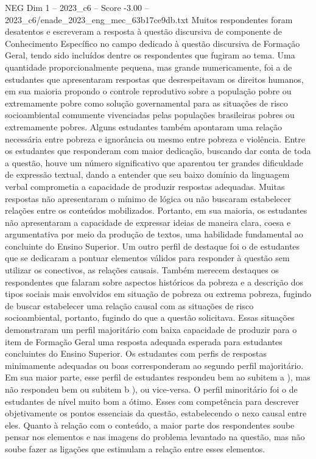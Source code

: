 \begin{textsample}{NEG Dim 1 – 2023\_c6 – Score -3.00 – 2023\_c6/enade\_2023\_eng\_mec\_63b17ce9db.txt}
Muitos respondentes foram desatentos e escreveram a resposta à questão discursiva de componente de Conhecimento Específico no campo dedicado à questão discursiva de Formação Geral, tendo sido incluídos dentre os respondentes que fugiram ao tema.
Uma quantidade proporcionalmente pequena, mas grande numericamente, foi a de estudantes que apresentaram respostas que desrespeitavam os direitos humanos, em sua maioria propondo o controle reprodutivo sobre a população pobre ou extremamente pobre como solução governamental para as situações de risco socioambiental comumente vivenciadas pelas populações brasileiras pobres ou extremamente pobres.
Alguns estudantes também apontaram uma relação necessária entre pobreza e ignorância ou mesmo entre pobreza e violência.
Entre os estudantes que responderam com maior dedicação, buscando dar conta de toda a questão, houve um número significativo que aparentou ter grandes dificuldade de expressão textual, dando a entender que seu baixo domínio da linguagem verbal comprometia a capacidade de produzir respostas adequadas.
Muitas respostas não apresentaram o mínimo de lógica ou não buscaram estabelecer relações entre os conteúdos mobilizados.
Portanto, em sua maioria, os estudantes não apresentaram a capacidade de expressar ideias de maneira clara, coesa e argumentativa por meio da produção de textos, uma habilidade fundamental ao concluinte do Ensino Superior.
Um outro perfil de destaque foi o de estudantes que se dedicaram a pontuar elementos válidos para responder à questão sem utilizar os conectivos, as relações causais.
Também merecem destaques os respondentes que falaram sobre aspectos históricos da pobreza e a descrição dos tipos sociais mais envolvidos em situação de pobreza ou extrema pobreza, fugindo de buscar estabelecer uma relação causal com as situações de risco socioambiental, portanto, fugindo do que a questão solicitava.
Essas situações demonstraram um perfil majoritário com baixa capacidade de produzir para o item de Formação Geral uma resposta adequada esperada para estudantes concluintes do Ensino Superior.
Os estudantes com perfis de respostas minimamente adequadas ou boas corresponderam ao segundo perfil majoritário.
Em sua maior parte, esse perfil de estudantes respondeu bem ao subitem a ), mas não respondeu bem ou subitem b ), ou vice-versa.
O perfil minoritário foi o de estudantes de nível muito bom a ótimo.
Esses com competência para descrever objetivamente os pontos essenciais da questão, estabelecendo o nexo causal entre eles.
Quanto à relação com o conteúdo, a maior parte dos respondentes soube pensar nos elementos e nas imagens do problema levantado na questão, mas não soube fazer as ligações que estimulam a relação entre esses elementos.

\end{textsample}
